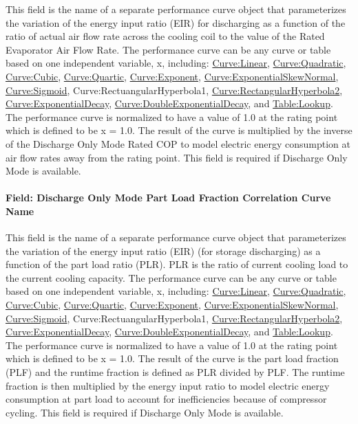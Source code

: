 This field is the name of a separate performance curve object that parameterizes the variation of the energy input ratio (EIR) for discharging as a function of the ratio of actual air flow rate across the cooling coil to the value of the Rated Evaporator Air Flow Rate. The performance curve can be any curve or table based on one independent variable, x, including: \hyperref[curvelinear]{Curve:Linear}, \hyperref[curvequadratic]{Curve:Quadratic}, \hyperref[curvecubic]{Curve:Cubic}, \hyperref[curvequartic]{Curve:Quartic}, \hyperref[curveexponent]{Curve:Exponent}, \hyperref[curveexponentialskewnormal]{Curve:ExponentialSkewNormal}, \hyperref[curvesigmoid]{Curve:Sigmoid}, Curve:RectuangularHyperbola1, \hyperref[curverectangularhyperbola2]{Curve:RectangularHyperbola2}, \hyperref[curveexponentialdecay]{Curve:ExponentialDecay}, \hyperref[curvedoubleexponentialdecay]{Curve:DoubleExponentialDecay}, and \hyperref[tablelookup]{Table:Lookup}. The performance curve is normalized to have a value of 1.0 at the rating point which is defined to be x = 1.0. The result of the curve is multiplied by the inverse of the Discharge Only Mode Rated COP to model electric energy consumption at air flow rates away from the rating point. This field is required if Discharge Only Mode is available.

\paragraph{Field: Discharge Only Mode Part Load Fraction Correlation Curve Name}\label{field-discharge-only-mode-part-load-fraction-correlation-curve-name}

This field is the name of a separate performance curve object that parameterizes the variation of the energy input ratio (EIR) (for storage discharging) as a function of the part load ratio (PLR). PLR is the ratio of current cooling load to the current cooling capacity. The performance curve can be any curve or table based on one independent variable, x, including: \hyperref[curvelinear]{Curve:Linear}, \hyperref[curvequadratic]{Curve:Quadratic}, \hyperref[curvecubic]{Curve:Cubic}, \hyperref[curvequartic]{Curve:Quartic}, \hyperref[curveexponent]{Curve:Exponent}, \hyperref[curveexponentialskewnormal]{Curve:ExponentialSkewNormal}, \hyperref[curvesigmoid]{Curve:Sigmoid}, Curve:RectuangularHyperbola1, \hyperref[curverectangularhyperbola2]{Curve:RectangularHyperbola2}, \hyperref[curveexponentialdecay]{Curve:ExponentialDecay}, \hyperref[curvedoubleexponentialdecay]{Curve:DoubleExponentialDecay}, and \hyperref[tablelookup]{Table:Lookup}. The performance curve is normalized to have a value of 1.0 at the rating point which is defined to be x = 1.0. The result of the curve is the part load fraction (PLF) and the runtime fraction is defined as PLR divided by PLF. The runtime fraction is then multiplied by the energy input ratio to model electric energy consumption at part load to account for inefficiencies because of compressor cycling. This field is required if Discharge Only Mode is available.

